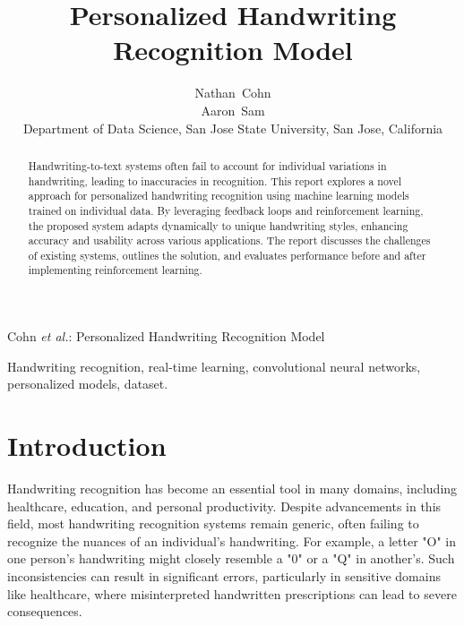 \documentclass[journal]{IEEEtran}
\begin{document}
\title{Personalized Handwriting Recognition Model}

\author{Nathan~Cohn\\
        Aaron~Sam\\
        Department of Data Science, San Jose State University, San Jose, California%
        }

% 
{Cohn \MakeLowercase{\textit{et al.}}: Personalized Handwriting Recognition Model}

\maketitle

\begin{abstract}
Handwriting-to-text systems often fail to account for individual variations in handwriting, leading to inaccuracies in recognition. This report explores a novel approach for personalized handwriting recognition using machine learning models trained on individual data. By leveraging feedback loops and reinforcement learning, the proposed system adapts dynamically to unique handwriting styles, enhancing accuracy and usability across various applications. The report discusses the challenges of existing systems, outlines the solution, and evaluates performance before and after implementing reinforcement learning.
\end{abstract}

\begin{IEEEkeywords}
Handwriting recognition, real-time learning, convolutional neural networks, personalized models, dataset.
\end{IEEEkeywords}

\IEEEpeerreviewmaketitle

\section{Introduction}
Handwriting recognition has become an essential tool in many domains, including healthcare, education, and personal productivity. Despite advancements in this field, most handwriting recognition systems remain generic, often failing to recognize the nuances of an individual's handwriting. For example, a letter "O" in one person's handwriting might closely resemble a "0" or a "Q" in another's. Such inconsistencies can result in significant errors, particularly in sensitive domains like healthcare, where misinterpreted handwritten prescriptions can lead to severe consequences.
\end{document}
